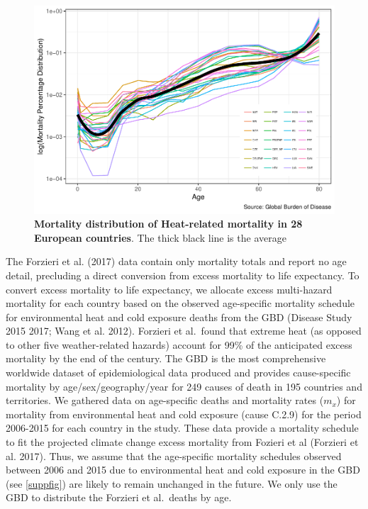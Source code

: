 \documentclass[12pt,]{article}
\makeatletter
\def\maxwidth{\ifdim\Gin@nat@width>\linewidth\linewidth
\else\Gin@nat@width\fi}
\let\Oldincludegraphics\includegraphics
\renewcommand{\includegraphics}[1]{\Oldincludegraphics[width=\maxwidth]{#1}}
\makeatother
\begin{document}
\begin{figure}
\centering
\includegraphics{MS-cclifeexpec_files/figure-latex/suppfig-1.pdf}
\caption{\textbf{Mortality distribution of Heat-related mortality in 28
European countries}. The thick black line is the average\label{suppfig}}
\end{figure}

The Forzieri et al. (2017) data contain only mortality totals and report
no age detail, precluding a direct conversion from excess mortality to
life expectancy. To convert excess mortality to life expectancy, we
allocate excess multi-hazard mortality for each country based on the
observed age-specific mortality schedule for environmental heat and cold
exposure deaths from the GBD (Disease Study 2015 2017; Wang et al.
2012). Forzieri et al.~found that extreme heat (as opposed to other five
weather-related hazards) account for 99\% of the anticipated excess
mortality by the end of the century. The GBD is the most comprehensive
worldwide dataset of epidemiological data produced and provides
cause-specific mortality by age/sex/geography/year for 249 causes of
death in 195 countries and territories. We gathered data on age-specific
deaths and mortality rates (\(m_x\)) for mortality from environmental
heat and cold exposure (cause C.2.9) for the period 2006-2015 for each
country in the study. These data provide a mortality schedule to fit the
projected climate change excess mortality from Fozieri et al (Forzieri
et al. 2017). Thus, we assume that the age-specific mortality schedules
observed between 2006 and 2015 due to environmental heat and cold
exposure in the GBD (see \autoref{suppfig}) are likely to remain
unchanged in the future. We only use the GBD to distribute the Forzieri
et al.~deaths by age.
\end{document}
